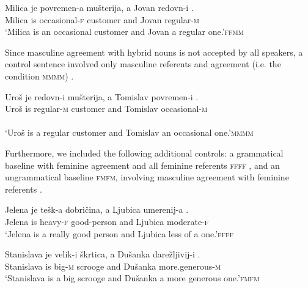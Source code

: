 \documentclass[output=paper,
modfonts,
newtxmath,
hidelinks
]{langscibook}
\begin{document}
  		\ea \gll Milica je povremen{-a} mušterija, a Jovan redovn{-i} \underline{\hspace{1.5cm}}.\\
  		Milica is occasional{-\textsc{f}} customer and Jovan regular{-\textsc{m}}\\
  		\glt `Milica is an occasional customer and Jovan a regular one.'\hfill \textsc{ffmm}\label{ex13}
        \z
  		
\noindent Since masculine agreement with hybrid nouns is not accepted by all speakers, a control sentence involved only masculine referents and agreement (i.e. the condition \textsc{mmmm}) .

		\ea \gll Uroš je redovn{-i} mušterija, a Tomislav povremen{-i} \underline{\hspace{1.5cm}}.\\
  			Uroš is regular{-\textsc{m}} customer and Tomislav occasional{-\textsc{m}}\\ \\
  			\glt `Uroš is a regular customer and Tomislav an occasional one.'\hfill \textsc{mmmm}\label{ex14}
            \z
     

\noindent Furthermore, we included the following additional controls: a grammatical baseline with feminine agreement and all feminine referents \textsc{ffff} , and an ungrammatical baseline \textsc{fmfm}, involving masculine agreement with feminine referents . 

  			\ea \gll Jelena je tešk{-a} dobričina, a Ljubica umerenij{-a} \underline{\hspace{1.5cm}}.\\
  			Jelena is heavy{-\textsc{f}} good-person and Ljubica moderate{-\textsc{f}}\\
  			\glt `Jelena is a really good person and Ljubica less of a one.'\hfill  \textsc{ffff}\label{ex15}
            \z
			
  			\ea \gll Stanislava je velik{-i} škrtica, a Dušanka darežljivij{-i} \underline{\hspace{1.5cm}}.\\
  			Stanislava is big{-\textsc{m}} scrooge and Dušanka more.generous{-\textsc{m}}\\
  			\glt `Stanislava is a big scrooge and Dušanka a more generous one.'\hfill  \textsc{fmfm}\label{ex16}
            \z
\end{document}
